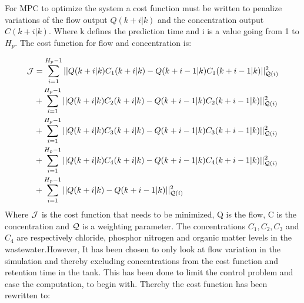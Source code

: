 

For MPC to optimize the system a cost function must be written to penalize variations of the flow output $Q(k+i|k)$ and the concentration output $C(k+i|k)$. Where k defines the prediction time and i is a value going from 1 to $H_p$. The cost function for flow and concentration is:

\begin{equation}
\begin{aligned}
	 \CMcal{J} &= \sum_{i=1}^{H_p-1} || Q(k+i|k)C_1(k+i|k)-Q(k+i-1|k)C_1(k+i-1|k)||_{\CMcal{Q}(i)}^2 \\&+\sum_{i=1}^{H_p-1} || Q(k+i|k)C_2(k+i|k)-Q(k+i-1|k)C_2(k+i-1|k)||_{\CMcal{Q}(i)}^2 \\&+\sum_{i=1}^{H_p-1} || Q(k+i|k)C_3(k+i|k)-Q(k+i-1|k)C_3(k+i-1|k)||_{\CMcal{Q}(i)}^2\\&+\sum_{i=1}^{H_p-1} || Q(k+i|k)C_4(k+i|k)-Q(k+i-1|k)C_4(k+i-1|k)||_{\CMcal{Q}(i)}^2 \\& +\sum_{i=1}^{H_p-1} || Q(k+i|k)-Q(k+i-1|k)||_{\CMcal{Q}(i)}^2
\end{aligned}	
\end{equation}
Where $\CMcal{J}$ is the cost function that needs to be minimized, Q is the flow, C is the concentration and $\CMcal{Q}$ is a weighting parameter. The concentrations $C_1, C_2, C_3$ and $C_4$ are respectively chloride, phosphor nitrogen and organic matter levels in the wastewater.However, It has been chosen to only look at flow variation in the simulation and thereby excluding concentrations from the cost function and retention time in the tank. This has been done to limit the control problem and ease the computation, to begin with. Thereby the cost function has been rewritten to: 


